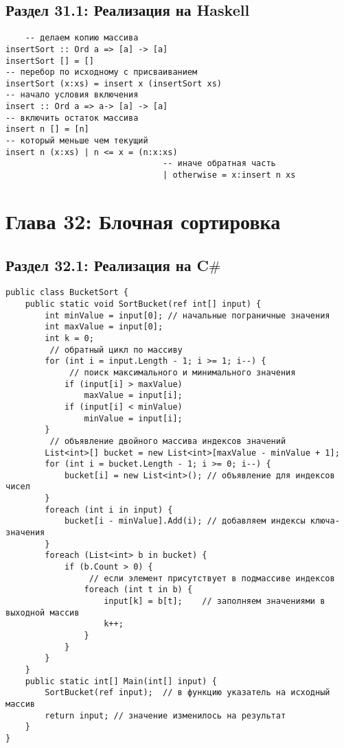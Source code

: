 \section*{Раздел 31.1: Реализация на Haskell}
\begin{tcolorbox}
\begin{verbatim}
	-- делаем копию массива
insertSort :: Ord a => [a] -> [a]
insertSort [] = []
-- перебор по исходному с присваиванием
insertSort (x:xs) = insert x (insertSort xs)
-- начало условия включения
insert :: Ord a => a-> [a] -> [a]
-- включить остаток массива
insert n [] = [n]
-- который меньше чем текущий
insert n (x:xs) | n <= x = (n:x:xs)
								-- иначе обратная часть
								| otherwise = x:insert n xs
\end{verbatim}
\end{tcolorbox}


\newpage
\chapter*{Глава 32: Блочная сортировка} 

\section*{Раздел 32.1: Реализация на C$\#$}
\begin{tcolorbox}
\begin{verbatim}
public class BucketSort {
	public static void SortBucket(ref int[] input) {
		int minValue = input[0]; // начальные пограничные значения
		int maxValue = input[0];
		int k = 0;
		 // обратный цикл по массиву
		for (int i = input.Length - 1; i >= 1; i--) {
			 // поиск максимального и минимального значения
			if (input[i] > maxValue) 
				maxValue = input[i];
			if (input[i] < minValue) 
				minValue = input[i];
		}
		 // объявление двойного массива индексов значений
		List<int>[] bucket = new List<int>[maxValue - minValue + 1];
		for (int i = bucket.Length - 1; i >= 0; i--) {
			bucket[i] = new List<int>(); // объявление для индексов чисел
		}
		foreach (int i in input) {
			bucket[i - minValue].Add(i); // добавляем индексы ключа-значения
		}
		foreach (List<int> b in bucket) {
			if (b.Count > 0) {
				 // если элемент присутствует в подмассиве индексов
				foreach (int t in b) {
					input[k] = b[t];	// заполняем значениями в выходной массив
					k++;
				}
			}
		}
	}
	public static int[] Main(int[] input) {
		SortBucket(ref input);	// в функцию указатель на исходный массив
		return input; // значение изменилось на результат
	}
}
\end{verbatim}
\end{tcolorbox}

